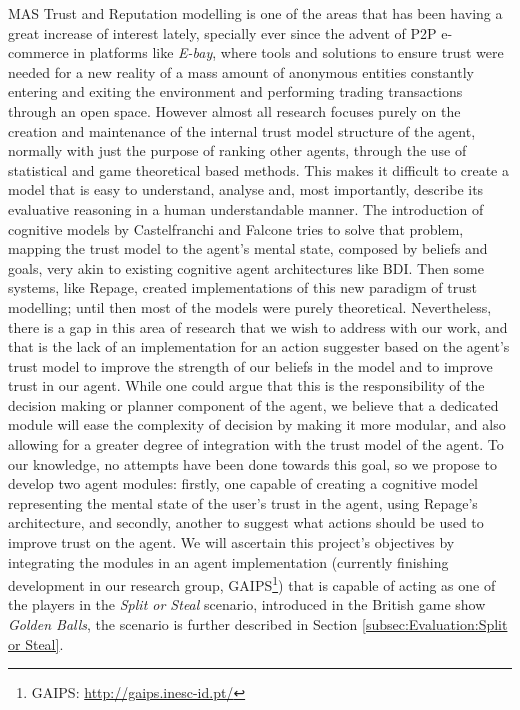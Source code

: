 \ac{MAS} Trust and Reputation modelling is one of the areas that has been having a great increase of interest lately, specially ever since the advent of \ac{P2P} e-commerce in platforms like \textit{E-bay}\cite{eBay2002}, where tools and solutions to ensure trust were needed for a new reality of a mass amount of anonymous entities constantly entering and exiting the environment and performing trading transactions through an open space. However almost all research focuses purely on the creation and maintenance of the internal trust model structure of the agent, normally with just the purpose of ranking other agents, through the use of statistical and game theoretical based methods. This makes it difficult to create a model that is easy to understand, analyse and, most importantly, describe its evaluative reasoning in a human understandable manner. The introduction of cognitive models by Castelfranchi and Falcone \cite{Castelfranchi1998} tries to solve that problem, mapping the trust model to the agent's mental state, composed by beliefs and goals, very akin to existing cognitive agent architectures like BDI\cite{Rao1995}. Then some systems, like Repage\cite{Sabater2006}, created implementations of this new paradigm of trust modelling; until then most of the models were purely theoretical. Nevertheless, there is a gap in this area of research that we wish to address with our work, and that is the lack of an implementation for an action suggester based on the agent's trust model to improve the strength of our beliefs in the model and to improve trust in our agent. While one could argue that this is the responsibility of the decision making or planner component of the agent, we believe that a dedicated module will ease the complexity of decision by making it more modular, and also allowing for a greater degree of integration with the trust model of the agent. To our knowledge, no attempts have been done towards this goal, so we propose to develop two agent modules: firstly, one capable of creating a cognitive model representing the mental state of the user's trust in the agent, using Repage's architecture, and secondly, another to suggest what actions should be used to improve trust on the agent. We will ascertain this project's objectives by integrating the modules in an agent implementation (currently finishing development in our research group, \acs{GAIPS}\footnote{\ac{GAIPS}: \url{http://gaips.inesc-id.pt/}}) that is capable of acting as one of the players in the \textit{Split or Steal} scenario, introduced in the British game show \textit{Golden Balls}\cite{Wikipedia.Golden.Balls}, the scenario is further described in Section \ref{subsec:Evaluation:Split or Steal}. 


